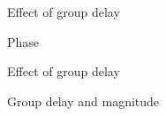 \documentclass[10pt]{beamer}
\begin{document}
%
\begin{frame}{Effect of group delay}
	\begin{block}{Phase}
		\begin{center}
		\end{center}		
	\end{block}
\end{frame}

\begin{frame}{Effect of group delay}
	\begin{block}{Group delay and magnitude}
		\begin{center}
		\end{center}		
	\end{block}
\end{frame}
\end{document}

